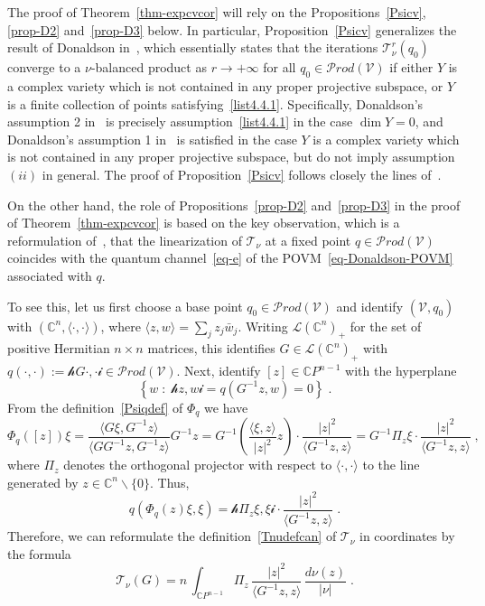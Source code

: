 \documentclass[11pt]{article}
\theoremstyle{definition}
\numberwithin{equation}{section}
\numberwithin{figure}{section}
\numberwithin{table}{section}
\let\cal\mathscr
\newcommand{\CCC}{{\mathbb{C}}}
\newcommand{\cV}{{\mathcal{V}}}
\newcommand\< {\mathcal{h}}
\renewcommand\> {\mathcal{i}}
\newcommand\TT {{\cal T}}
\newcommand*\cL{\mathscr{L}}
\newcommand{\Prod}{{\mathcal Prod}}
\begin{document}
The proof of Theorem~\ref{thm-expcvcor} will rely on the Propositions~\ref{Psicv}, \ref{prop-D2} and~\ref{prop-D3} below. In particular, Proposition~\ref{Psicv} generalizes the result of Donaldson in~\cite[p.~581]{D}, which essentially states that the iterations $\TT_\nu^r(q_0)$ converge to a $\nu$-balanced product as $r\rightarrow+\infty$ for all $q_0\in\Prod(\cV)$ if either $Y$ is a complex variety which is not contained in any proper projective subspace, or $Y$ is a finite collection of points satisfying~\eqref{list4.4.1}. Specifically, Donaldson's assumption 2 in~\cite[p.~581]{D} is precisely assumption~\eqref{list4.4.1} in the case $\dim Y=0$, and Donaldson's assumption 1 in~\cite[p.~581]{D} is satisfied in the case $Y$ is a complex variety which is not contained in any proper projective subspace, but do not imply assumption $(ii)$ in general. The proof of Proposition~\ref{Psicv} follows closely the lines of~\cite[p.~581]{D}.

On the other hand, the role of Propositions~\ref{prop-D2} and~\ref{prop-D3} in the proof of Theorem~\ref{thm-expcvcor} is based on the key observation, which is a reformulation of~\cite[p.~609]{D}, that the linearization of $\TT_\nu$ at a fixed point $q\in\Prod(\cV)$ coincides with the quantum channel~\eqref{eq-e} of the POVM~\eqref{eq-Donaldson-POVM} associated with $q$.

To see this, let us first choose a base point $q_0\in\Prod(\cV)$ and identify $(\cV,q_0)$ with $(\CCC^n, \langle\cdot,\cdot\rangle)$, where $\langle z,w\rangle = \sum_j z_j\bar{w}_j$. Writing $\cL(\CCC^n)_+$ for the set of positive Hermitian $n \times n$ matrices, this identifies $G \in \cL(\CCC^n)_+$ with $q(\cdot,\cdot):= \<G\cdot,\cdot\>\in\Prod(\cV)$. Next, identify $[z] \in \CCC P^{n-1}$ with the hyperplane
\[
\left\{w\;:\; \< z,w\>= q(G^{-1}z,w) = 0\right\}\;.
\]
From the definition~\eqref{Psiqdef} of $\Phi_q$ we have
\[
\Phi_q([z])\xi = \frac{\langle G\xi,G^{-1}z \rangle}{\langle GG^{-1}z,G^{-1}z\rangle} G^{-1}z
=G^{-1} \left(\frac{\langle \xi,z\rangle}{|z|^2}z\right) \cdot \frac{|z|^2}{\langle G^{-1}z,z\rangle}
=G^{-1}\Pi_z\xi \cdot \frac{|z|^2}{\langle G^{-1}z,z\rangle } \;,
\]
where $\Pi_z$ denotes the orthogonal projector with respect to $\langle \cdot,\cdot\rangle$ to the line generated by $z \in \CCC^n\backslash\{0\}$. Thus,
\[
q(\Phi_q(z)\xi,\xi) = \<\Pi_z\xi,\xi\> \cdot \frac{|z|^2}{\langle G^{-1}z,z\rangle} \;.
\]
Therefore, we can reformulate the definition~\eqref{Tnudefcan} of $\TT_\nu$ in coordinates by the formula
\begin{equation}\label{Tnudef}
\TT_\nu(G)=n\,\int_{\CCC P^{n-1}} \Pi_z\,\frac{|z|^2} {\langle G^{-1} z,z\rangle }\,\frac{d\nu(z)}{|\nu|}\;.
\end{equation}
\end{document}
